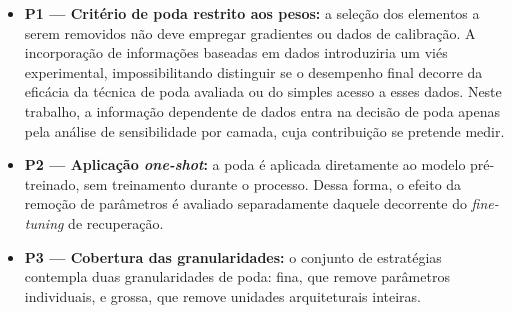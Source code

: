 \begin{itemize}
    \item \textbf{P1 --- Critério de poda restrito aos pesos:} a seleção dos elementos a
          serem removidos não deve empregar gradientes ou dados de calibração. A
          incorporação de informações baseadas em dados introduziria um viés experimental,
          impossibilitando distinguir se o desempenho final decorre da eficácia da técnica
          de poda avaliada ou do simples acesso a esses dados. Neste trabalho, a informação
          dependente de dados entra na decisão de poda apenas pela análise de sensibilidade
          por camada, cuja contribuição se pretende
          medir.
    \item \textbf{P2 --- Aplicação \textit{one-shot}:} a poda é aplicada diretamente ao
          modelo pré-treinado, sem treinamento durante o processo. Dessa forma, o efeito da
          remoção de parâmetros é avaliado separadamente daquele decorrente do
          \textit{fine-tuning} de recuperação.
    \item \textbf{P3 --- Cobertura das granularidades:} o conjunto de estratégias contempla
          duas granularidades de poda: fina, que remove parâmetros individuais, e grossa, que
          remove unidades arquiteturais inteiras.
\end{itemize}

